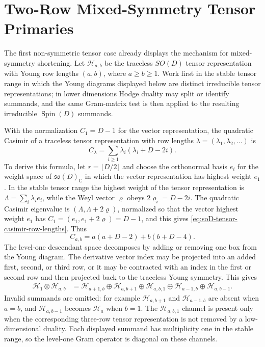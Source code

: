 \section{Two-Row Mixed-Symmetry Tensor Primaries}

The first non-symmetric tensor case already displays the mechanism for
mixed-symmetry shortening.  Let \(\mathcal H_{a,b}\) be the traceless
\(SO(D)\) tensor representation with Young row lengths
\((a,b)\), where \(a\ge b\ge1\).  Work first in the stable tensor range in
which the Young diagrams displayed below are distinct irreducible tensor
representations; in lower dimensions Hodge duality may split or identify
summands, and the same Gram-matrix test is then applied to the resulting
irreducible \(\operatorname{Spin}(D)\) summands.

With the normalization \(C_1=D-1\) for the vector representation, the
quadratic Casimir of a traceless tensor representation with row lengths
\(\lambda=(\lambda_1,\lambda_2,\ldots)\) is
\begin{equation}
  C_\lambda
  =
  \sum_{i\ge1}\lambda_i(\lambda_i+D-2i).
  \label{eq:soD-tensor-casimir-row-lengths}
\end{equation}
To derive this formula, let \(r=\lfloor D/2\rfloor\) and choose the
orthonormal basis \(e_i\) for the weight space of
\(\mathfrak{so}(D)_\mathbb C\) in which the vector representation has highest
weight \(e_1\).  In the stable tensor range the highest weight of the tensor
representation is \(\Lambda=\sum_i\lambda_i e_i\), while the Weyl vector
\(\varrho\) obeys \(2\varrho_i=D-2i\).  The quadratic Casimir eigenvalue is
\((\Lambda,\Lambda+2\varrho)\), normalized so that the vector highest weight
\(e_1\) has \(C_1=(e_1,e_1+2\varrho)=D-1\), and this gives
\eqref{eq:soD-tensor-casimir-row-lengths}.
Thus
\[
  C_{a,b}=a(a+D-2)+b(b+D-4).
\]
The level-one descendant space decomposes by adding or removing one box from
the Young diagram.  The derivative vector index may be projected into an
added first, second, or third row, or it may be contracted with an index in
the first or second row and then projected back to the traceless Young
symmetry.  This gives
\begin{align}
  \mathcal H_1\otimes\mathcal H_{a,b}
  &=
  \mathcal H_{a+1,b}
  \oplus
  \mathcal H_{a,b+1}
  \oplus
  \mathcal H_{a,b,1}
  \oplus
  \mathcal H_{a-1,b}
  \oplus
  \mathcal H_{a,b-1}.
  \label{eq:two-row-vector-tensor-decomposition}
\end{align}
Invalid summands are omitted: for example \(\mathcal H_{a,b+1}\) and
\(\mathcal H_{a-1,b}\) are absent when \(a=b\), and
\(\mathcal H_{a,b-1}\) becomes \(\mathcal H_a\) when \(b=1\).  The
\(\mathcal H_{a,b,1}\) channel is present only when the corresponding
three-row tensor representation is not removed by a low-dimensional duality.
Each displayed summand has multiplicity one in the stable range, so the
level-one Gram operator is diagonal on these channels.


